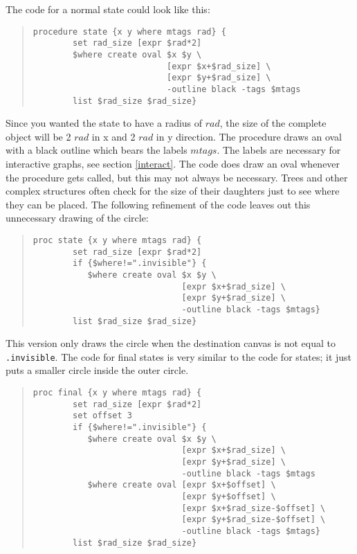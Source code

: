 The code for a normal state could look like this:

\begin{quote}
\begin{verbatim}
procedure state {x y where mtags rad} {
        set rad_size [expr $rad*2] 
        $where create oval $x $y \
                           [expr $x+$rad_size] \ 
                           [expr $y+$rad_size] \
                           -outline black -tags $mtags
        list $rad_size $rad_size}
\end{verbatim}
\end{quote}

Since you wanted the state to have a radius of $rad$, the size of the
complete object will be 2 $rad$ in x and 2 $rad$ in y direction. The
procedure draws an oval with a black outline which bears the labels
$mtags$. The labels are necessary for interactive graphs, see
section \ref{interact}.
The code does draw an oval whenever the procedure gets called, but this
may not always be necessary. Trees and other complex structures often
check for the size of their daughters just to see where they can be
placed. The following refinement of the code leaves out this unnecessary
drawing of the circle:  

\begin{quote}
\begin{verbatim}
proc state {x y where mtags rad} {
        set rad_size [expr $rad*2] 
        if {$where!=".invisible"} {
           $where create oval $x $y \
                              [expr $x+$rad_size] \ 
                              [expr $y+$rad_size] \
                              -outline black -tags $mtags}
        list $rad_size $rad_size}
\end{verbatim}
\end{quote}

This version only draws the circle when the destination canvas is not
equal to {\tt .invisible}.
The code for final states is very similar to the code for states; it
just puts a smaller circle inside the outer circle.

\begin{quote}
\begin{verbatim}
proc final {x y where mtags rad} {
        set rad_size [expr $rad*2] 
        set offset 3
        if {$where!=".invisible"} {
           $where create oval $x $y \
                              [expr $x+$rad_size] \ 
                              [expr $y+$rad_size] \
                              -outline black -tags $mtags
           $where create oval [expr $x+$offset] \
                              [expr $y+$offset] \
                              [expr $x+$rad_size-$offset] \ 
                              [expr $y+$rad_size-$offset] \
                              -outline black -tags $mtags}
        list $rad_size $rad_size}
\end{verbatim}
\end{quote}

